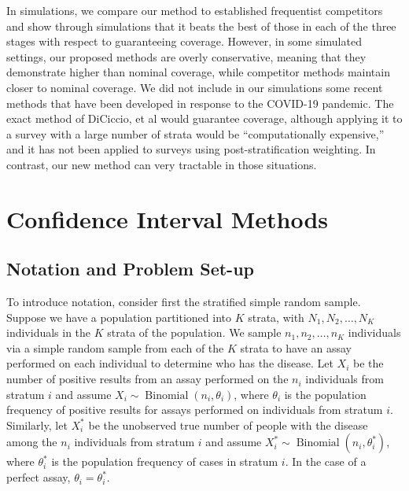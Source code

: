 In simulations, we compare our method to established frequentist competitors and show through simulations that it beats the best of those in each of the three stages with respect to guaranteeing coverage.
However, in some simulated settings, our proposed methods are overly conservative, meaning that they demonstrate higher than nominal coverage, while competitor methods maintain closer to nominal coverage.
We did not include in our simulations some recent methods that have been developed in response to the COVID-19 pandemic.\cite{Cai:2020,DiCi:2021,rosin2021estimating}
The exact method of DiCiccio, et al\cite{DiCi:2021} would guarantee coverage, although applying it to a survey with a large number of strata would be ``computationally expensive,'' and it has not been applied to surveys using post-stratification weighting. In contrast, our new method can very tractable in those situations.


\section{Confidence Interval Methods}

\subsection{Notation and Problem Set-up}
\label{ch_3:sec-notation}


To introduce notation, consider first the stratified simple random sample.
Suppose we have a population partitioned into \( K \) strata, with \( N_1, N_2, \ldots, N_K \) individuals in the \( K \) strata of the population.
We sample \( n_1, n_2, \ldots, n_K \) individuals via a simple random sample from each of the \( K \) strata to have an assay performed on each individual to determine who has the disease.
Let \( X_i \) be the number of positive results from an assay performed on the \( n_i \) individuals from stratum \( i \) and assume \( X_i \sim \operatorname{Binomial}(n_i, \theta_i) \), where \( \theta_i \) is the population frequency of positive results for assays performed on individuals from stratum \( i \).
Similarly, let \( X_i^* \) be the unobserved true number of people with the disease among the \( n_i \) individuals from stratum \( i \) and assume \( X_i^* \sim \operatorname{Binomial}(n_i, \theta_i^*) \), where \( \theta_i^* \) is the population frequency of cases in stratum \( i \).
In the case of a perfect assay, \( \theta_i = \theta_i^* \).




